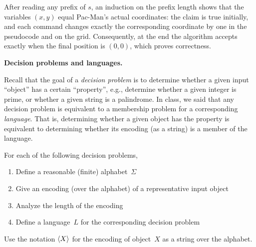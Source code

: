 \documentclass[11pt,addpoints,answers]{exam}
\begin{document}
\begin{questions}
\begin{parts}
\begin{solution}
      After reading any prefix of $s$, an induction on the prefix length shows
      that the variables $(x,y)$ equal Pac-Man's actual coordinates: the claim
      is true initially, and each command changes exactly the corresponding
      coordinate by one in the pseudocode and on the grid.  Consequently, at
      the end the algorithm accepts exactly when the final position is
      $(0,0)$, which proves correctness.
    \end{solution}
  \end{parts}

  \question \textbf{Decision problems and languages.}

  Recall that the goal of a \emph{decision problem} is to determine whether a given input ``object'' has a certain ``property'', e.g., determine whether a given integer is prime, or whether a given string is a palindrome. In class, we said that any decision problem is equivalent to a membership problem for a corresponding \emph{language}. That is, determining whether a given object has the property is equivalent to determining whether its encoding (as a string) is a member of the language.

  For each of the following decision problems,
  \begin{enumerate}
      \item[(i)] Define a reasonable (finite) alphabet~$\Sigma$
      \item[(ii)] Give an encoding (over the alphabet) of a representative input object
      \item[(iii)] Analyze the length of the encoding
      \item[(iv)] Define a language~$L$ for the corresponding decision problem
  \end{enumerate}

  Use the notation $\langle X\rangle$ for the encoding of object~$X$ as a string over the alphabet.

\end{questions}
\end{document}
